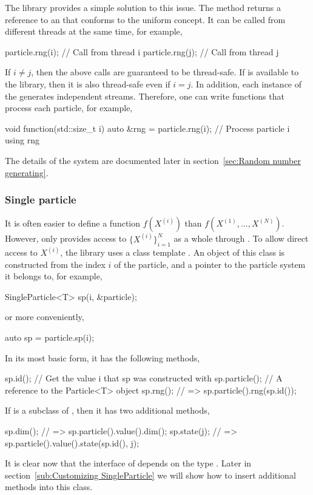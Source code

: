 The library provides a simple solution to this issue. The method
 returns a reference to an \rng that conforms to the
\cppoo uniform \rng concept. It can be called from different threads at the
same time, for example,
\begin{cppcode}
  particle.rng(i); // Call from thread i
  particle.rng(j); // Call from thread j
\end{cppcode}
If $i \ne j$, then the above calls are guaranteed to be thread-safe. If \tbb is
available to the library, then it is also thread-safe even if $i = j$. In
addition, each instance of the \rng generates independent streams. Therefore,
one can write functions that process each particle, for example,
\begin{cppcode}
  void function(std::size_t i)
  {
    auto &rng = particle.rng(i);
    // Process particle i using rng
  }
\end{cppcode}
The details of the \rng system are documented later in section~\ref{sec:Random
  number generating}.

\subsubsection{Single particle}
\label{ssub:Single particle}

It is often easier to define a function $f(X^{(i)})$ than
$f(X^{(1)},\dots,X^{(N)})$. However,  only provides
access to $\{X^{(i)}\}_{i=1}^N$ as a whole through
. To allow direct access to $X^{(i)}$, the library
uses a class template . An object of this class is
constructed from the index $i$ of the particle, and a pointer to the particle
system it belongs to, for example,
\begin{cppcode}
  SingleParticle<T> sp(i, &particle);
\end{cppcode}
or more conveniently,
\begin{cppcode}
  auto sp = particle.sp(i);
\end{cppcode}
In its most basic form, it has the following methods,
\begin{cppcode}
  sp.id();       // Get the value i that sp was constructed with
  sp.particle(); // A reference to the Particle<T> object
  sp.rng();      // => sp.particle().rng(sp.id());
\end{cppcode}
If  is a subclass of , then it has two
additional methods,
\begin{cppcode}
  sp.dim();    // => sp.particle().value().dim();
  sp.state(j); // => sp.particle().value().state(sp.id(), j);
\end{cppcode}
It is clear now that the interface of  depends on
the type . Later in section~\ref{sub:Customizing SingleParticle}
we will show how to insert additional methods into this class.

